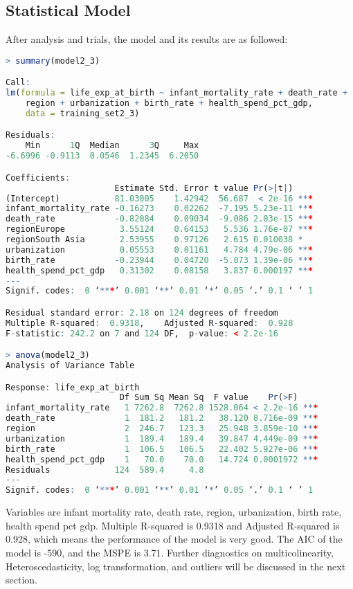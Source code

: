 \subsection{Statistical Model}
After analysis and trials, the model and its results are as followed:
\begin{lstlisting}[language=R, caption=Result of the model]
> summary(model2_3)

Call:
lm(formula = life_exp_at_birth ~ infant_mortality_rate + death_rate + 
    region + urbanization + birth_rate + health_spend_pct_gdp, 
    data = training_set2_3)

Residuals:
    Min      1Q  Median      3Q     Max 
-6.6996 -0.9113  0.0546  1.2345  6.2050 

Coefficients:
                      Estimate Std. Error t value Pr(>|t|)    
(Intercept)           81.03005    1.42942  56.687  < 2e-16 ***
infant_mortality_rate -0.16273    0.02262  -7.195 5.23e-11 ***
death_rate            -0.82084    0.09034  -9.086 2.03e-15 ***
regionEurope           3.55124    0.64153   5.536 1.76e-07 ***
regionSouth Asia       2.53955    0.97126   2.615 0.010038 *  
urbanization           0.05553    0.01161   4.784 4.79e-06 ***
birth_rate            -0.23944    0.04720  -5.073 1.39e-06 ***
health_spend_pct_gdp   0.31302    0.08158   3.837 0.000197 ***
---
Signif. codes:  0 ‘***’ 0.001 ‘**’ 0.01 ‘*’ 0.05 ‘.’ 0.1 ‘ ’ 1

Residual standard error: 2.18 on 124 degrees of freedom
Multiple R-squared:  0.9318,	Adjusted R-squared:  0.928 
F-statistic: 242.2 on 7 and 124 DF,  p-value: < 2.2e-16

> anova(model2_3)
Analysis of Variance Table

Response: life_exp_at_birth
                       Df Sum Sq Mean Sq  F value    Pr(>F)    
infant_mortality_rate   1 7262.8  7262.8 1528.064 < 2.2e-16 ***
death_rate              1  181.2   181.2   38.120 8.716e-09 ***
region                  2  246.7   123.3   25.948 3.859e-10 ***
urbanization            1  189.4   189.4   39.847 4.449e-09 ***
birth_rate              1  106.5   106.5   22.402 5.927e-06 ***
health_spend_pct_gdp    1   70.0    70.0   14.724 0.0001972 ***
Residuals             124  589.4     4.8                       
---
Signif. codes:  0 ‘***’ 0.001 ‘**’ 0.01 ‘*’ 0.05 ‘.’ 0.1 ‘ ’ 1
\end{lstlisting}



Variables are infant mortality rate, death rate, region, urbanization, birth rate, health spend pct gdp. Multiple R-squared is 0.9318 and Adjusted R-squared is 0.928, which means the performance of the model is very good. The AIC of the model is -590, and the MSPE is 3.71. Further diagnostics on multicolinearity, Heteroscedasticity, log transformation, and outliers will be discussed in the next section.

